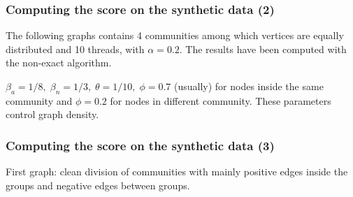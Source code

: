 \documentclass{beamer}
\begin{document}
\begin{frame}[c]
	\frametitle{Computing the score on the synthetic data (2)}
	The following graphs contains 4 communities among which vertices are
	equally distributed and 10
	threads, with $\alpha = 0.2$. The results have been computed with the
	non-exact algorithm.

	\bigskip

	$\beta _{a} = 1/8, \;\beta_{n} = 1/3, \; \theta = 1/10, \; \phi = 0.7$
	(usually) for nodes inside the same community and $\phi = 0.2$ for nodes
	in different community. These parameters control graph density.
\end{frame}

\begin{frame}[c]
	\frametitle{Computing the score on the synthetic data (3)}
	First graph: clean division of communities with mainly positive edges inside the groups and negative edges between groups.


\end{frame}
\end{document}
